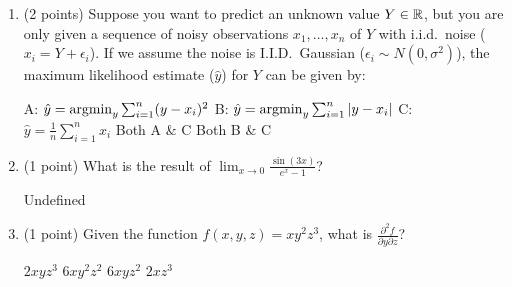 \begin{enumerate}[start]
\item (2 points) Suppose you want to predict an unknown value $Y \in \mathbb{R}$, but you are only given
a sequence of noisy observations $x_1, \dots, x_n$ of $Y$ with i.i.d.\ noise ($x_i = Y + \epsilon_i $). If we assume the noise is I.I.D.\ Gaussian ($\epsilon_i \sim N(0, \sigma^2)$), the maximum likelihood
estimate ($\hat y$) for $Y$ can be given by: 


\begin{checkboxes}
	\choice A: $ \hat y = \mathop{\mathrm{argmin}}_y \sum_{i=1}^{n} (y - x_i)^2 $ 
	\choice B: $ \hat y = \mathop{\mathrm{argmin}}_y \sum_{i=1}^{n} |y - x_i| $
	\choice C: $\hat y = \frac{1}{n} \sum_{i=1}^{n} x_i $
	\choice Both A \&  C
	\choice Both B \& C
	
\end{checkboxes}



\item (1 point) What is the result of 
$\lim_{x \to 0} \frac{\sin(3x)}{e^x - 1}$?

\begin{oneparcheckboxes}
\choice Undefined
\end{oneparcheckboxes}
\item (1 point) Given the function $f(x, y, z) = xy^2z^3$, what is $\frac{\partial^2f}{\partial y\partial z}$?

\begin{oneparcheckboxes}
\choice $2xyz^3$
\choice $6xy^2z^2$
\choice $6xyz^2$
\choice $2xz^3$
\end{oneparcheckboxes}






\end{enumerate}




\pagebreak